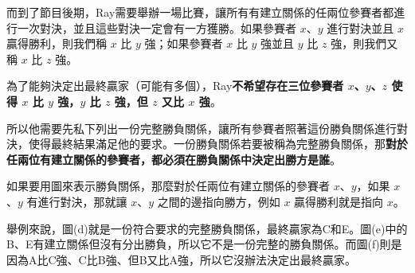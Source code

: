 而到了節目後期，Ray需要舉辦一場比賽，讓所有有建立關係的任兩位參賽者都進行一次對決，並且這些對決一定會有一方獲勝。如果參賽者
\(x\)、\(y\) 進行對決並且 \(x\) 贏得勝利，則我們稱 \(x\) 比 \(y\)
強；如果參賽者 \(x\) 比 \(y\) 強並且 \(y\) 比 \(z\) 強，則我們又稱 \(x\)
比 \(z\) 強。

為了能夠決定出最終贏家（可能有多個），Ray\textbf{不希望存在三位參賽者
\(x\)、\(y\)、\(z\) 使得 \(x\) 比 \(y\) 強，\(y\) 比 \(z\) 強，但 \(z\)
又比 \(x\) 強}。

\newpage

所以他需要先私下列出一份完整勝負關係，讓所有參賽者照著這份勝負關係進行對決，使得最終結果滿足他的要求。一份勝負關係若要被稱為完整勝負關係，那\textbf{對於任兩位有建立關係的參賽者，都必須在勝負關係中決定出勝方是誰}。

如果要用圖來表示勝負關係，那麼對於任兩位有建立關係的參賽者
\(x\)、\(y\)，如果 \(x\)、\(y\) 有進行對決，那就讓 \(x\)、\(y\)
之間的邊指向勝方，例如 \(x\) 贏得勝利就是指向 \(x\)。

舉例來說，圖(d)就是一份符合要求的完整勝負關係，最終贏家為C和E。圖(e)中的B、E有建立關係但沒有分出勝負，所以它不是一份完整的勝負關係。而圖(f)則是因為A比C強、C比B強、但B又比A強，所以它沒辦法決定出最終贏家。

